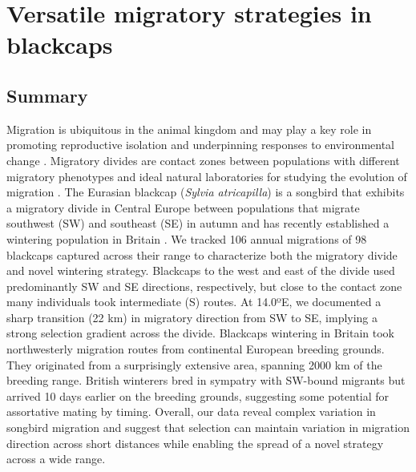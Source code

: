 \documentclass[a4paper, nobind]{templates/ociamthesis}
\begin{document}
\hypertarget{blackcap-geo}{%
\chapter{Versatile migratory strategies in blackcaps}\label{blackcap-geo}}

\hypertarget{summary}{%
\section{Summary}\label{summary}}

Migration is ubiquitous in the animal kingdom and may play a key role in promoting reproductive isolation \autocite{helbigSESWmigratingBlackcap1991,benschMorphologicalMolecularVariation1999,bearhopAssortativeMatingMechanism2005,irwinSiberianMigratoryDivides2005} and underpinning responses to environmental change \autocite{bertholdRapidMicroevolutionMigratory1992,plummerSupplementaryFeedingGardens2015}.
Migratory divides are contact zones between populations with different migratory phenotypes and ideal natural laboratories for studying the evolution of migration \autocite{delmoreGeneticsSeasonalMigration2016,delmoreHybridSongbirdsEmploy2014}.
The Eurasian blackcap (\emph{Sylvia atricapilla}) is a songbird that exhibits a migratory divide in Central Europe between populations that migrate southwest (SW) and southeast (SE) in autumn \autocite{helbigInheritanceMigratoryDirection1991,helbigPopulationDifferentiationMigratory1992,helbigSESWmigratingBlackcap1991} and has recently established a wintering population in Britain \autocite{leachWinteringBlackcapsBritain1981,bertholdMigratoryBehaviourPopulation1988,bertholdRapidMicroevolutionMigratory1992,bearhopAssortativeMatingMechanism2005}. We tracked 106 annual migrations of 98 blackcaps captured across their range to characterize both the migratory divide and novel wintering strategy.
Blackcaps to the west and east of the divide used predominantly SW and SE directions, respectively, but close to the contact zone many individuals took intermediate (S) routes. At 14.0ºE, we documented a sharp transition (22 km) in migratory direction from SW to SE, implying a strong selection gradient across the divide.
Blackcaps wintering in Britain took northwesterly migration routes from continental European breeding grounds. They originated from a surprisingly extensive area, spanning 2000 km of the breeding range. British winterers bred in sympatry with SW-bound migrants but arrived 10 days earlier on the breeding grounds, suggesting some potential for assortative mating by timing.
Overall, our data reveal complex variation in songbird migration and suggest that selection can maintain variation in migration direction across short distances while enabling the spread of a novel strategy across a wide range.
\end{document}
